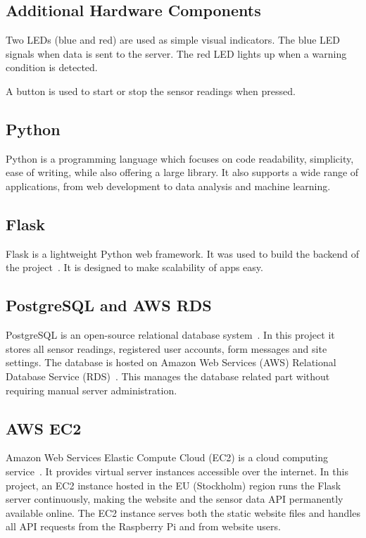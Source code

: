 \subsection*{Additional Hardware Components}

Two LEDs (blue and red) are used as simple visual indicators. The blue LED signals when data is
sent to the server. The red LED lights up when a warning condition is detected.

A button is used to start or stop the sensor readings when pressed.

\subsection*{Python}

Python is a programming language which focuses on code readability, simplicity, ease of
writing, while also offering a large library. It also supports a wide range of applications,
from web development to data analysis and machine learning.

\subsection*{Flask}

Flask is a lightweight Python web framework. It was used to build the backend of the
project~\cite{flask}. It is designed to make scalability of apps easy.

\subsection*{PostgreSQL and AWS RDS}

PostgreSQL is an open-source relational database system~\cite{postgresql}. In this project it
stores all sensor readings, registered user accounts, form messages and site settings. The
database is hosted on Amazon Web Services (AWS) Relational Database Service
(RDS)~\cite{awsrds}. This manages the database related part without requiring manual server
administration.

\subsection*{AWS EC2}

Amazon Web Services Elastic Compute Cloud (EC2) is a cloud computing service~\cite{awsec2}. It
provides virtual server instances accessible over the internet. In this project, an EC2 instance
hosted in the EU (Stockholm) region runs the Flask server continuously, making the website and
the sensor data API permanently available online. The EC2 instance serves both the static
website files and handles all API requests from the Raspberry Pi and from website users.

